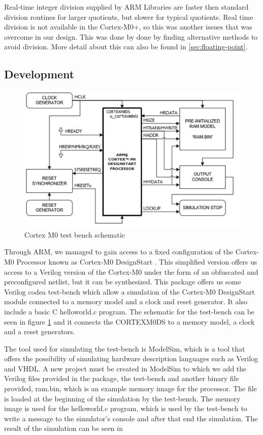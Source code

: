 Real-time integer division supplied by ARM Libraries are faster then standard division routines for larger quotients, but slower for typical  quotients. Real time division is not available in the Cortex-M0+, so this was another issues that was overcome in our design. This was done by done by finding alternative methods to avoid division. More detail about this can also be found in \ref{sec:floating-point}.

\subsection{Development}

\begin{figure}
\centering
\includegraphics[scale=0.7]{figures/test_bench_schematic.PNG}
\caption{Cortex M0 test bench schematic} \label{fig:test_bench}
\end{figure}

Through ARM, we managed to gain access to a fixed configuration of the Cortex-M0 Processor known as Cortex-M0 DesignStart \cite{armdesignstart}. This simplified version offers us access to a Verilog version of the Cortex-M0 under the form of an obfuscated and preconfigured netlist, but it can be synthesized. This package offers us some Verilog codea test-bench which allow a simulation of the Cortex-M0 DesignStart module connected to a memory model and a clock and reset generator. It also include a basic C helloworld.c program. The schematic for the test-bench can be seen in figure \ref{fig:test_bench} and it connects the CORTEXM0DS to a memory model, a clock and a reset generators.

The tool used for simulating the test-bench is ModelSim, which is a tool that offers the possibility of simulating hardware description languages such as Verilog and VHDL. A new project must be created in ModelSim to which we add the Verilog files provided in the package, the test-bench and another binary file provided, ram.bin, which is an example memory image for the processor. The file is loaded at the beginning of the simulation by the test-bench.  The memory image is used for the helloworld.c program, which is used by the test-bench to write a message to the simulator's console and after that end the simulation. The result of the simulation can be seen in

